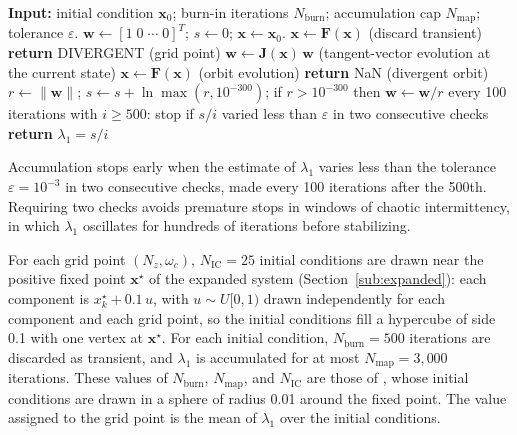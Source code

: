 \documentclass[journal]{IEEEtran}
\begin{document}
\begin{algorithm}[!t]
\caption{Single-vector estimation of $\lambda_1$ with periodic renormalization.}\label{alg:lyap}
\begin{algorithmic}[1]
\STATE \textbf{Input:} initial condition $\mathbf{x}_0$; burn-in iterations $N_{\text{burn}}$; accumulation cap $N_{\text{map}}$; tolerance $\varepsilon$.
\STATE $\mathbf{w}\leftarrow[1\;0\;\cdots\;0]^T$;\; $s\leftarrow 0$;\; $\mathbf{x}\leftarrow\mathbf{x}_0$.
  \STATE $\mathbf{x}\leftarrow\mathbf{F}(\mathbf{x})$ \quad(discard transient)
    \STATE \textbf{return} DIVERGENT \quad(grid point)
  \ENDIF
\ENDFOR
{}
  \STATE $\mathbf{w}\leftarrow\mathbf{J}(\mathbf{x})\,\mathbf{w}$ \quad(tangent-vector evolution at the current state)
  \STATE $\mathbf{x}\leftarrow\mathbf{F}(\mathbf{x})$ \quad(orbit evolution)
    \STATE \textbf{return} NaN \quad(divergent orbit)
  \ENDIF
    \STATE $r\leftarrow\|\mathbf{w}\|$;\; $s\leftarrow s+\ln\max(r,10^{-300})$;\; if $r>10^{-300}$ then $\mathbf{w}\leftarrow\mathbf{w}/r$
    \STATE every 100 iterations with $i\ge500$: stop if $s/i$ varied less than $\varepsilon$ in two consecutive checks
  \ENDIF
\ENDFOR
\STATE \textbf{return} $\lambda_1=s/i$
\end{algorithmic}
\end{algorithm}

Accumulation stops early when the estimate of $\lambda_1$ varies less than the
tolerance $\varepsilon=10^{-3}$ in two consecutive checks, made every 100
iterations after the 500th. Requiring two checks avoids premature stops in
windows of chaotic intermittency, in which $\lambda_1$ oscillates for hundreds
of iterations before stabilizing.

For each grid point $(N_z,\omega_c)$, $N_{\text{IC}}=25$ initial conditions are
drawn near the positive fixed point $\mathbf{x}^\star$ of the expanded system
(Section~\ref{sub:expanded}): each component is $x_k^\star+0.1\,u$, with
$u\sim U[0,1)$ drawn independently for each component and each grid point, so
the initial conditions fill a hypercube of side 0.1 with one vertex at
$\mathbf{x}^\star$. For each initial condition,
$N_{\text{burn}}=500$ iterations are discarded as transient, and $\lambda_1$ is
accumulated for at most $N_{\text{map}}=3{,}000$ iterations. These values of
$N_{\text{burn}}$, $N_\text{map}$, and $N_{\text{IC}}$ are those of
\cite{BorgesCNSNS2024}, whose initial conditions are drawn in a sphere of
radius 0.01 around the fixed point. The value assigned to the grid point is the
mean of $\lambda_1$ over the initial conditions.
\end{document}
